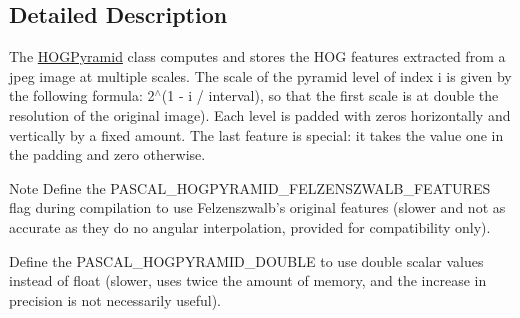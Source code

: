 \subsection{Detailed Description}
The \hyperlink{class_f_f_l_d_1_1_h_o_g_pyramid}{H\-O\-G\-Pyramid} class computes and stores the H\-O\-G features extracted from a jpeg image at multiple scales. The scale of the pyramid level of index {\ttfamily i} is given by the following formula\-: 2$^\wedge$(1 -\/ {\ttfamily i} / {\ttfamily interval}), so that the first scale is at double the resolution of the original image). Each level is padded with zeros horizontally and vertically by a fixed amount. The last feature is special\-: it takes the value one in the padding and zero otherwise. \begin{DoxyNote}{Note}
Define the P\-A\-S\-C\-A\-L\-\_\-\-H\-O\-G\-P\-Y\-R\-A\-M\-I\-D\-\_\-\-F\-E\-L\-Z\-E\-N\-S\-Z\-W\-A\-L\-B\-\_\-\-F\-E\-A\-T\-U\-R\-E\-S flag during compilation to use Felzenszwalb's original features (slower and not as accurate as they do no angular interpolation, provided for compatibility only). 

Define the P\-A\-S\-C\-A\-L\-\_\-\-H\-O\-G\-P\-Y\-R\-A\-M\-I\-D\-\_\-\-D\-O\-U\-B\-L\-E to use double scalar values instead of float (slower, uses twice the amount of memory, and the increase in precision is not necessarily useful). 
\end{DoxyNote}


